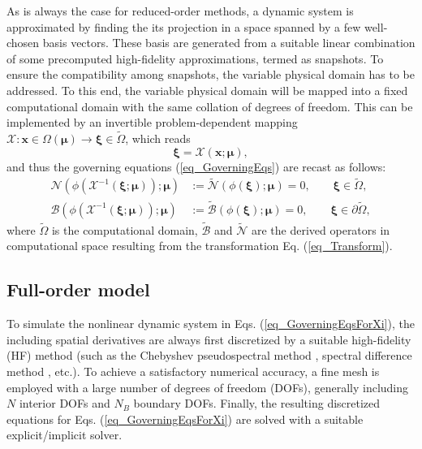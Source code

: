 \documentclass[preprint, 10pt]{elsarticle}
\begin{document}
As is always the case for reduced-order methods, a dynamic system is approximated by finding the its projection in a space spanned by a few well-chosen basis vectors. These basis are generated from a suitable linear combination of some precomputed high-fidelity approximations, termed as snapshots. To ensure the compatibility among snapshots, the variable physical domain has to be addressed. To this end, the variable physical domain will be mapped into a fixed computational domain with the same collation of degrees of freedom. This can be implemented by an invertible problem-dependent mapping $\mathcal{X} : \mathbf{x} \in \Omega\left(\pmb{\mu}\right) \to \pmb{ \xi} \in \widetilde \Omega$, which reads
\begin{equation}
\pmb{ \xi} = \mathcal{X} \left( \mathbf{x}; \pmb{\mu} \right),
\label{eq_Transform}
\end{equation}
and thus the governing equations (\ref{eq_GoverningEqs}) are recast as follows:
\begin{equation}
\begin{aligned}
\mathcal{N}\left(\phi\left( \mathcal{X}^{-1} \left( \pmb{ \xi}; \pmb{\mu} \right) \right); \pmb{\mu}\right)
&:=\widetilde {\mathcal{N}} \left(\phi\left( \pmb{ \xi} \right); \pmb{\mu}\right)
=0,  \qquad \pmb{ \xi} \in \widetilde \Omega,
\\
\mathcal{B}\left(\phi\left(\mathcal{X}^{-1} \left( \pmb{ \xi}; \pmb{\mu} \right)\right); \pmb{\mu}\right)
&:=\widetilde {\mathcal{B}} \left(\phi\left( \pmb{ \xi} \right); \pmb{\mu}\right)
=0,  \qquad \pmb{ \xi} \in \partial \widetilde \Omega,
\end{aligned}
\label{eq_GoverningEqsForXi}
\end{equation}
where $\widetilde \Omega$ is the computational domain, $\widetilde {\mathcal{B}}$ and $\widetilde {\mathcal{N}}$ are the derived operators in computational space resulting from the transformation Eq. (\ref{eq_Transform}).

\subsection{Full-order model}
To simulate the nonlinear dynamic system in Eqs. (\ref{eq_GoverningEqsForXi}), the including spatial derivatives are always first discretized by a suitable high-fidelity (HF) method (such as the Chebyshev pseudospectral method \cite{chen2018multidomain, chen2020parallel}, spectral difference method \cite{chen2020collocated}, etc.). To achieve a satisfactory numerical accuracy, a fine mesh is employed with a large number of degrees of freedom (DOFs), generally including $N$ interior DOFs and $N_B$ boundary DOFs. Finally, the resulting discretized equations for  Eqs. (\ref{eq_GoverningEqsForXi}) are solved with a suitable explicit/implicit solver.
\end{document}
